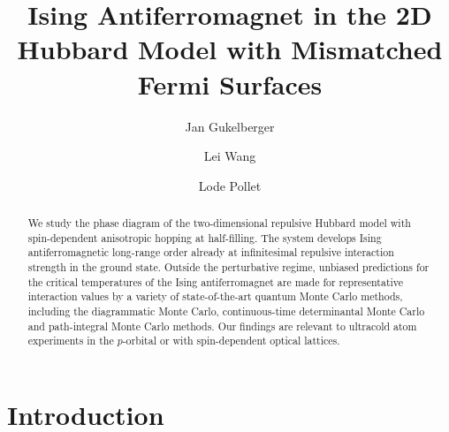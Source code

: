 \documentclass[twocolumn,superscriptaddress,pra,showpacs,longbibliography]{revtex4-1}
\newcommand{\<}{\langle}
\renewcommand{\>}{\rangle}
\begin{document}
\title{Ising Antiferromagnet in the 2D Hubbard Model with Mismatched Fermi Surfaces}

\author{Jan Gukelberger}
\author{Lei Wang}
\author{Lode Pollet}

\begin{abstract}
We study the phase diagram of the two-dimensional repulsive Hubbard model with spin-dependent anisotropic hopping at half-filling. The system develops Ising antiferromagnetic long-range order already at infinitesimal repulsive interaction strength in the ground state. Outside the perturbative regime, unbiased predictions for the critical temperatures of the Ising antiferromagnet are made for representative interaction values by a variety of state-of-the-art quantum Monte Carlo methods, including the diagrammatic Monte Carlo, continuous-time determinantal  Monte Carlo and path-integral Monte Carlo methods. Our findings are relevant to ultracold atom experiments in the $p$-orbital or with spin-dependent optical lattices. 
\end{abstract}
\maketitle


\section{Introduction}

\end{document}
